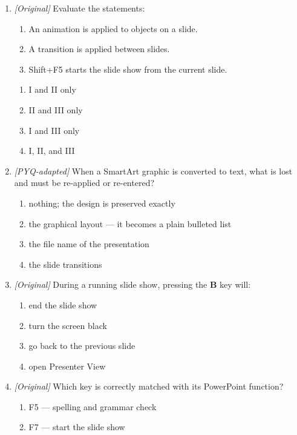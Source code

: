 \begin{enumerate}[label=\textbf{Q\arabic*.}, leftmargin=*]
\begin{enumerate}[label=\Alph*.]
    \item Reading View
    \item Formula View
  \end{enumerate}
\item \textit{[Original]} Evaluate the statements:
  \begin{enumerate}[label=\Roman*.]
    \item An animation is applied to objects on a slide.
    \item A transition is applied between slides.
    \item Shift+F5 starts the slide show from the current slide.
  \end{enumerate}
  \begin{enumerate}[label=\Alph*.]
    \item I and II only
    \item II and III only
    \item I and III only
    \item I, II, and III
  \end{enumerate}
\item \textit{[PYQ-adapted]} When a SmartArt graphic is converted to text, what
  is lost and must be re-applied or re-entered?
  \begin{enumerate}[label=\Alph*.]
    \item nothing; the design is preserved exactly
    \item the graphical layout --- it becomes a plain bulleted list
    \item the file name of the presentation
    \item the slide transitions
  \end{enumerate}
\item \textit{[Original]} During a running slide show, pressing the
\textbf{B} key will:
  \begin{enumerate}[label=\Alph*.]
    \item end the slide show
    \item turn the screen black
    \item go back to the previous slide
    \item open Presenter View
  \end{enumerate}
\item \textit{[Original]} Which key is correctly matched with its PowerPoint
  function?
  \begin{enumerate}[label=\Alph*.]
    \item F5 --- spelling and grammar check
    \item F7 --- start the slide show

\end{enumerate}
\end{enumerate}
